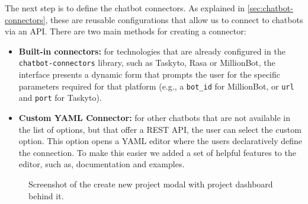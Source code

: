 The next step is to define the chatbot connectors.
As explained in \autoref{sec:chatbot-connectors},
these are reusable configurations
that allow us to connect to chatbots via an \ac{API}.
There are two main methods for creating a connector:
\begin{itemize}
  \item \textbf{Built-in connectors:}
    for technologies that are already configured
    in the \texttt{chatbot-connectors} library,
    such as Taskyto, Rasa or MillionBot,
    the interface presents a dynamic form
    that prompts the user for the specific parameters
    required for that platform
    (e.g., a \texttt{bot\_id} for MillionBot,
    or \texttt{url} and \texttt{port} for Taskyto).
  \item \textbf{Custom YAML Connector:}
    for other chatbots that are not available in the list of options,
    but that offer a \ac{REST} \ac{API},
    the user can select the custom option.
    This option opens a YAML editor
    where the users declaratively define the connection.
    To make this easier we added a set of helpful features to the editor,
    such as, documentation and examples.
\end{itemize}

\begin{figure}[htpb]
  \centering
  \caption{Screenshot of the create new project modal with project dashboard behind it.}
  \label{fig:ss-new-project}
\end{figure}


